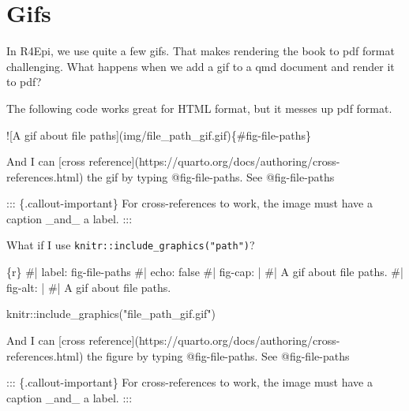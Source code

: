 \documentclass[
  letterpaper,
  DIV=11,
  numbers=noendperiod]{scrreprt}
\newenvironment{Shaded}{\begin{snugshade}}{\end{snugshade}}
\newcommand{\AlertTok}[1]{\textcolor[rgb]{0.68,0.00,0.00}{#1}}
\newcommand{\CommentTok}[1]{\textcolor[rgb]{0.37,0.37,0.37}{#1}}
\newcommand{\InformationTok}[1]{\textcolor[rgb]{0.37,0.37,0.37}{#1}}
\newcommand{\NormalTok}[1]{\textcolor[rgb]{0.00,0.23,0.31}{#1}}
\newcommand{\OtherTok}[1]{\textcolor[rgb]{0.00,0.23,0.31}{#1}}
\begin{document}
\chapter{Gifs}\label{sec-gifs}

In R4Epi, we use quite a few gifs. That makes rendering the book to pdf
format challenging. What happens when we add a gif to a qmd document and
render it to pdf?

The following code works great for HTML format, but it messes up pdf
format.

\begin{Shaded}
\begin{Highlighting}[]
\AlertTok{![A gif about file paths](img/file\_path\_gif.gif)}\NormalTok{\{\#fig{-}file{-}paths\}}

\NormalTok{And I can }\CommentTok{[}\OtherTok{cross reference}\CommentTok{](https://quarto.org/docs/authoring/cross{-}references.html)}\NormalTok{ the gif by typing }\InformationTok{\textasciigrave{}@fig{-}file{-}paths\textasciigrave{}}\NormalTok{. See @fig{-}file{-}paths}

\NormalTok{::: \{.callout{-}important\}}
\NormalTok{For cross{-}references to work, the image must have a caption \_and\_ a label.}
\NormalTok{:::}
\end{Highlighting}
\end{Shaded}

What if I use \texttt{knitr::include\_graphics("path")}?

\begin{Shaded}
\begin{Highlighting}[]

\InformationTok{\textasciigrave{}\textasciigrave{}\textasciigrave{}\{r\}}
\InformationTok{\#| label: fig{-}file{-}paths}
\InformationTok{\#| echo: false}
\InformationTok{\#| fig{-}cap: |}
\InformationTok{\#|   A gif about file paths.}
\InformationTok{\#| fig{-}alt: |}
\InformationTok{\#|   A gif about file paths.}

\InformationTok{knitr::include\_graphics("file\_path\_gif.gif")}
\InformationTok{\textasciigrave{}\textasciigrave{}\textasciigrave{}}

\NormalTok{And I can }\CommentTok{[}\OtherTok{cross reference}\CommentTok{](https://quarto.org/docs/authoring/cross{-}references.html)}\NormalTok{ the figure by typing }\InformationTok{\textasciigrave{}@fig{-}file{-}paths\textasciigrave{}}\NormalTok{. See @fig{-}file{-}paths}

\NormalTok{::: \{.callout{-}important\}}
\NormalTok{For cross{-}references to work, the image must have a caption \_and\_ a label.}
\NormalTok{:::}
\end{Highlighting}
\end{Shaded}
\end{document}
